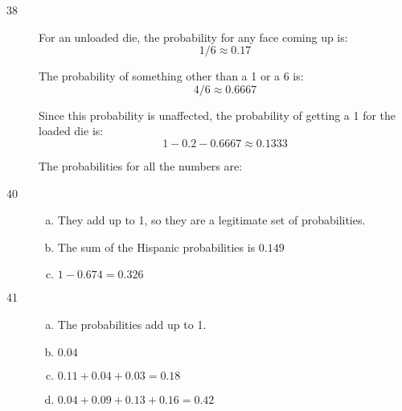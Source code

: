 \documentclass[letterpaper]{exam}
\begin{document}
\begin{description}
      \item[38]
        For an unloaded die, the probability for any face coming up is:
        \[
          1/6 \approx 0.17
        \]

        The probability of something other than a 1 or a 6 is:
        \[
          4/6 \approx 0.6667
        \]

        Since this probability is unaffected, the probability of getting a 1 for
        the loaded die is:
        \[
          1 - 0.2 - 0.6667 \approx 0.1333
        \]

        The probabilities for all the numbers are:


      \newpage

      \item[40]
        \begin{enumerate}[(a)]
          \item They add up to 1, so they are a legitimate set of probabilities.

          \item The sum of the Hispanic probabilities is $\boxed{ 0.149 }$

          \item $1 - 0.674 = \boxed{ 0.326 }$
        \end{enumerate}

      \item[41]
        \begin{enumerate}[(a)]
          \item The probabilities add up to 1.

          \item $\boxed{ 0.04 }$

          \item $0.11 + 0.04 + 0.03 = \boxed{ 0.18 }$

          \item $0.04 + 0.09 + 0.13 + 0.16 = \boxed{ 0.42 }$


\end{enumerate}
\end{description}
\end{document}
